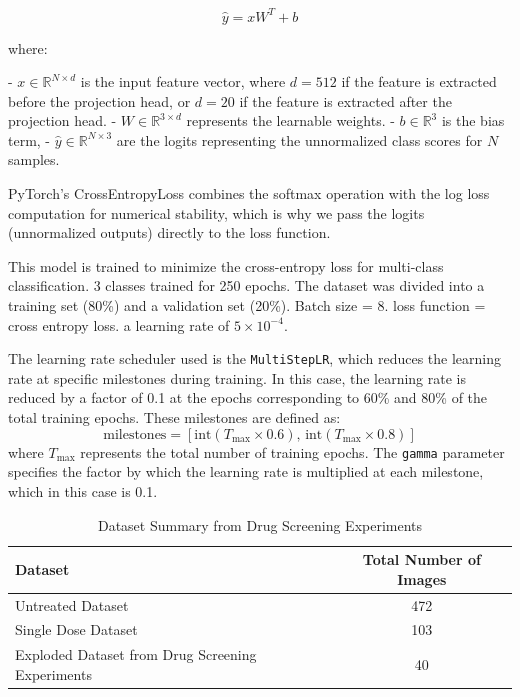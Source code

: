 \[
\hat{y} = xW^T + b
\]

where:

- \(x \in \mathbb{R}^{N \times d}\) is the input feature vector, where \(d = 512\) if the feature is extracted before the projection head, or \(d = 20\) if the feature is 
extracted after the projection head.  
- \(W \in \mathbb{R}^{3 \times d}\) represents the learnable weights.  
- \(b \in \mathbb{R}^3\) is the bias term,
- \(\hat{y} \in \mathbb{R}^{N \times 3}\) are the logits representing the unnormalized class scores for \(N\) samples.

PyTorch's CrossEntropyLoss combines the softmax operation with the log loss computation for numerical stability, which is why we pass the logits (unnormalized outputs) directly
to the loss function.

This model is trained to minimize the cross-entropy loss for multi-class classification.
3 classes trained for 250 epochs. The dataset was divided into a training set (80\%) and a validation set (20\%). Batch size = 8. loss function = 
cross entropy loss.  a learning rate of \( 5 \times 10^{-4} \). 

The learning rate scheduler used is the \texttt{MultiStepLR}, which reduces the learning rate at specific milestones during training. In this case, the learning rate is 
reduced by a factor of 0.1 at the epochs corresponding to 60\% and 80\% of the total training epochs. These milestones are defined as:
\[
\text{milestones} = \left[ \text{int}(T_{\text{max}} \times 0.6), \, \text{int}(T_{\text{max}} \times 0.8) \right]
\]
where \( T_{\text{max}} \) represents the total number of training epochs. The \texttt{gamma} parameter specifies the factor by which the learning rate is multiplied at each 
milestone, which in this case is 0.1.

\begin{table}[h!]
    \centering
    \caption{Dataset Summary from Drug Screening Experiments}
    \label{tab:dataset_summary}
    \begin{tabular}{lc}
    \toprule
    \textbf{Dataset}                              & \textbf{Total Number of Images} \\ 
    \midrule
    Untreated Dataset                             & 472                            \\ 
    Single Dose Dataset                           & 103                            \\ 
    Exploded Dataset from Drug Screening Experiments & 40                             \\ 
    \bottomrule
    \end{tabular}
\end{table}

